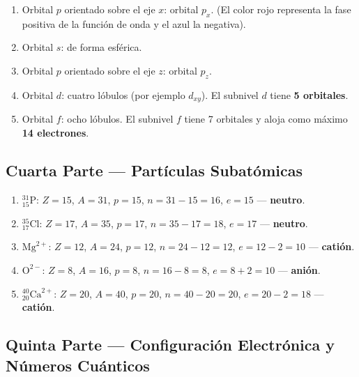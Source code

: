 \documentclass[12pt, letterpaper]{article}
\begin{document}
  \begin{enumerate}[leftmargin=*, label=\textbf{(\alph*)}]
    \item Orbital \textbf{$p$} orientado sobre el eje $x$: orbital $p_x$. (El color rojo representa la fase positiva de la función de onda y el azul la negativa).
    \item Orbital \textbf{$s$}: de forma esférica.
    \item Orbital \textbf{$p$} orientado sobre el eje $z$: orbital $p_z$.
    \item Orbital \textbf{$d$}: cuatro lóbulos (por ejemplo $d_{xy}$). El subnivel $d$ tiene \textbf{5 orbitales}.
    \item Orbital \textbf{$f$}: ocho lóbulos. El subnivel $f$ tiene 7 orbitales y aloja como máximo \textbf{14 electrones}.
  \end{enumerate}

  \newpage

  \subsection*{Cuarta Parte — Partículas Subatómicas}

  \begin{enumerate}[leftmargin=*, label=\textbf{\arabic*.}]
    \item ${}^{31}_{15}\text{P}$: $Z = 15$, $A = 31$, $p = 15$, $n = 31 - 15 = 16$, $e = 15$ — \textbf{neutro}.
    \item ${}^{35}_{17}\text{Cl}$: $Z = 17$, $A = 35$, $p = 17$, $n = 35 - 17 = 18$, $e = 17$ — \textbf{neutro}.
    \item $\text{Mg}^{2+}$: $Z = 12$, $A = 24$, $p = 12$, $n = 24 - 12 = 12$, $e = 12 - 2 = 10$ — \textbf{catión}.
    \item $\text{O}^{2-}$: $Z = 8$, $A = 16$, $p = 8$, $n = 16 - 8 = 8$, $e = 8 + 2 = 10$ — \textbf{anión}.
    \item ${}^{40}_{20}\text{Ca}^{2+}$: $Z = 20$, $A = 40$, $p = 20$, $n = 40 - 20 = 20$, $e = 20 - 2 = 18$ — \textbf{catión}.
  \end{enumerate}

  \subsection*{Quinta Parte — Configuración Electrónica y Números Cuánticos}
\end{document}
